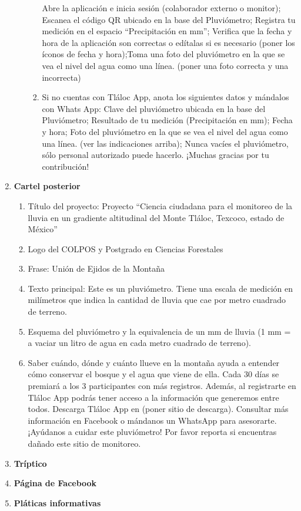 \begin{enumerate}
\begin{enumerate}
\begin{enumerate}
            Abre la aplicación e inicia sesión (colaborador externo o monitor); Escanea el código QR ubicado en la base del Pluviómetro; Registra tu medición en el espacio “Precipitación en mm”; Verifica que la fecha  y hora de la aplicación son correctas o edítalas si es necesario (poner los íconos de fecha y hora);Toma una foto del pluviómetro en la que se vea el nivel del agua como una línea. (poner una foto correcta y una incorrecta)            
            \item 	Si no cuentas con Tláloc App, anota los siguientes datos y mándalos con Whats App: Clave del pluviómetro ubicada en la base del Pluviómetro; Resultado de tu medición (Precipitación en mm); Fecha y hora; Foto del pluviómetro en la que se vea el nivel del agua como una línea. (ver las indicaciones arriba); Nunca vacíes el pluviómetro, sólo personal autorizado puede hacerlo. ¡Muchas gracias por tu contribución!            
        \end{enumerate}
    \end{enumerate}
    \item \textbf{Cartel posterior} \begin{enumerate}
        \item Título del proyecto: Proyecto “Ciencia ciudadana para el monitoreo de la lluvia en un gradiente altitudinal del Monte Tláloc, Texcoco, estado de México”
        \item Logo del COLPOS y Postgrado en Ciencias Forestales
        \item Frase: Unión de Ejidos de la Montaña
        \item Texto principal: Este es un pluviómetro. Tiene una escala de medición en milímetros que indica la cantidad de lluvia que cae por metro cuadrado de terreno.
        \item Esquema del pluviómetro y la equivalencia de un mm de lluvia (1 mm = a vaciar un litro de agua en cada metro cuadrado de terreno).
        \item Saber cuándo, dónde y cuánto llueve en la montaña ayuda a entender cómo conservar el bosque y el agua que viene de ella. Cada 30 días se premiará a los 3 participantes con más registros. Además, al registrarte en Tláloc App podrás tener acceso a la información que generemos entre todos. Descarga Tláloc App en (poner sitio de descarga). Consultar más información en Facebook o mándanos un WhatsApp para asesorarte. ¡Ayúdanos a cuidar este pluviómetro! Por favor reporta si encuentras dañado este sitio de monitoreo.
    \end{enumerate}
    \item \textbf{Tríptico}
    \item \textbf{Página de Facebook}
    \item \textbf{Pláticas informativas}
\end{enumerate}
